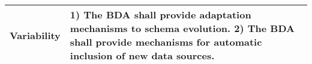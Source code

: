 \documentclass[conference]{IEEEtran}
\begin{document}
\begin{center}
\begin{table*}
\begin{tabular}{ | m{1.5cm} | m{14.5cm} |}
        \hline

        Variability & 1) The BDA shall provide adaptation mechanisms to schema evolution. 2) The BDA shall provide mechanisms for automatic inclusion of new data sources. \\

        \hline
  
    \end{tabular}
    \end{table*}
\end{center}




    


\end{document}
